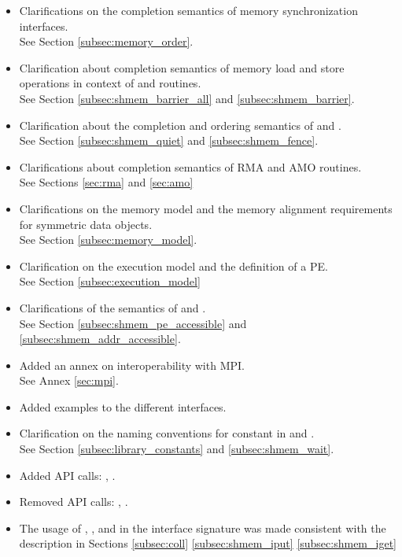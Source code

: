 \begin{itemize}
\item Clarifications on the completion semantics of memory synchronization 
interfaces.\\See Section \ref{subsec:memory_order}.
\item Clarification about completion semantics of memory load and store 
operations in context of  and  
routines.\\See Section \ref{subsec:shmem_barrier_all} and \ref{subsec:shmem_barrier}.
\item Clarification about the completion and ordering semantics of  and .
\\See Section \ref{subsec:shmem_quiet} and \ref{subsec:shmem_fence}.
\item Clarifications about completion semantics of \ac{RMA} and \ac{AMO} routines.
\\See Sections \ref{sec:rma} and \ref{sec:amo}
\item Clarifications on the memory model and the memory alignment requirements for symmetric data objects.
\\See Section \ref{subsec:memory_model}.
\item Clarification on the execution model and the definition of a \ac{PE}.
\\See Section \ref{subsec:execution_model}
\item Clarifications of the semantics of  and .
\\See Section \ref{subsec:shmem_pe_accessible} and \ref{subsec:shmem_addr_accessible}.
\item Added an annex on interoperability with \ac{MPI}.\\See Annex \ref{sec:mpi}.
\item Added examples to the different interfaces.
\item Clarification on the naming conventions for constant in \Clang{} and \Fortran{}.
\\See Section \ref{subsec:library_constants} and \ref{subsec:shmem_wait}.
\item Added \ac{API} calls: , . 
\item Removed \ac{API} calls: , . 

\item The usage of , , and  in the interface signature 
      was made consistent with the description in Sections \ref{subsec:coll}
      \ref{subsec:shmem_iput} \ref{subsec:shmem_iget}

\end{itemize}
